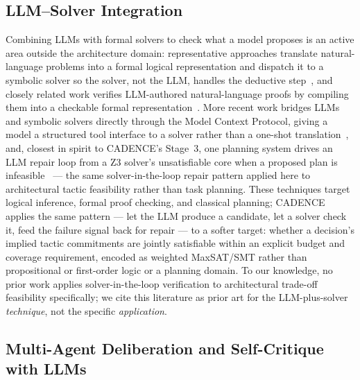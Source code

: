 \documentclass[preprint,12pt,authoryear]{elsarticle}
\renewcommand{\_}{\textunderscore\allowbreak{}}
\begin{document}
\subsection{LLM--Solver Integration}

Combining LLMs with formal solvers to check what a model proposes is an active area outside the architecture domain: representative approaches translate natural-language problems into a formal logical representation and dispatch it to a symbolic solver so the solver, not the LLM, handles the deductive step~\citep{pan2023logiclm}, and closely related work verifies LLM-authored natural-language proofs by compiling them into a checkable formal representation~\citep{olausson2023linc}. More recent work bridges LLMs and symbolic solvers directly through the Model Context Protocol, giving a model a structured tool interface to a solver rather than a one-shot translation~\citep{szeider2025mcpsolver}, and, closest in spirit to CADENCE's Stage~3, one planning system drives an LLM repair loop from a Z3 solver's unsatisfiable core when a proposed plan is infeasible~\citep{hao2024planningz3} --- the same solver-in-the-loop repair pattern applied here to architectural tactic feasibility rather than task planning. These techniques target logical inference, formal proof checking, and classical planning; CADENCE applies the same pattern --- let the LLM produce a candidate, let a solver check it, feed the failure signal back for repair --- to a softer target: whether a decision's implied tactic commitments are jointly satisfiable within an explicit budget and coverage requirement, encoded as weighted MaxSAT/SMT rather than propositional or first-order logic or a planning domain. To our knowledge, no prior work applies solver-in-the-loop verification to architectural trade-off feasibility specifically; we cite this literature as prior art for the LLM-plus-solver \emph{technique}, not the specific \emph{application}.

\subsection{Multi-Agent Deliberation and Self-Critique with LLMs}
\end{document}
